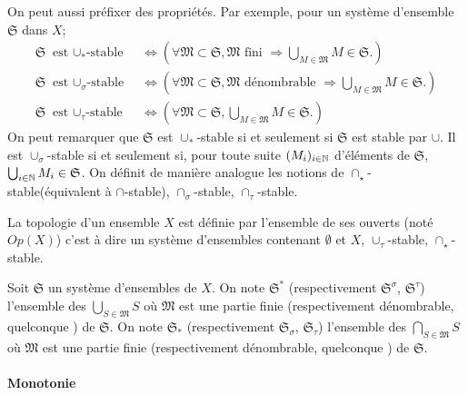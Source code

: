 On peut aussi préfixer des propriétés. Par exemple, pour un système d'ensemble $\mathfrak{S}$ dans $X$;
\begin{align*}
\mathfrak{S} \text{ est $\cup_*$-stable } &\Leftrightarrow \left( \forall \mathfrak{M} \subset \mathfrak{S}, \mathfrak{M} \text{ fini } \Rightarrow \bigcup_{M \in \mathfrak{M}}M \in \mathfrak{S}.\right) \\
\mathfrak{S} \text{ est $\cup_\sigma$-stable } &\Leftrightarrow \left( \forall \mathfrak{M} \subset \mathfrak{S}, \mathfrak{M} \text{ dénombrable } \Rightarrow \bigcup_{M \in \mathfrak{M}}M \in \mathfrak{S}.\right) \\
\mathfrak{S} \text{ est $\cup_\tau$-stable } &\Leftrightarrow \left( \forall \mathfrak{M} \subset \mathfrak{S}, \bigcup_{M \in \mathfrak{M}}M \in \mathfrak{S}.\right)
\end{align*}
On peut remarquer que $\mathfrak{S}$ est $\cup_*$-stable si et seulement si $\mathfrak{S}$ est stable par $\cup$. Il est $\cup_\sigma$-stable si et seulement si, pour toute suite $(M_i)_{i\in \mathbb{N}}$ d'éléments de $\mathfrak{S}$, $\bigcup_{i\in \mathbb{N}}M_i \in \mathfrak{S}$.\newline
On définit de manière analogue les notions de $\cap_\star$-stable(équivalent à $\cap$-stable), $\cap_\sigma$-stable, $\cap_\tau$-stable.
\begin{rem}\label{rem:topologie}
 La topologie d'un ensemble $X$ est définie par l'ensemble de ses ouverts (noté $Op(X)$) c'est à dire un système d'ensembles contenant $\emptyset$ et $X$, $\cup_\tau$-stable, $\cap_\star$-stable.
\end{rem}
\begin{nota}
   Soit $\mathfrak{S}$ un système d'ensembles de $X$.\newline
   On note $\mathfrak{S}^{*}$ (respectivement $\mathfrak{S}^{\sigma}$, $\mathfrak{S}^{\tau}$) l'ensemble des $\bigcup_{S \in \mathfrak{M}}S$ où $\mathfrak{M}$ est une partie finie (respectivement dénombrable, quelconque ) de $\mathfrak{S}$.\newline
   On note $\mathfrak{S}_{*}$ (respectivement $\mathfrak{S}_{\sigma}$, $\mathfrak{S}_{\tau}$) l'ensemble des $\bigcap_{S \in \mathfrak{M}}S$ où $\mathfrak{M}$ est une partie finie (respectivement dénombrable, quelconque ) de $\mathfrak{S}$.
\end{nota}

\paragraph{Monotonie}

